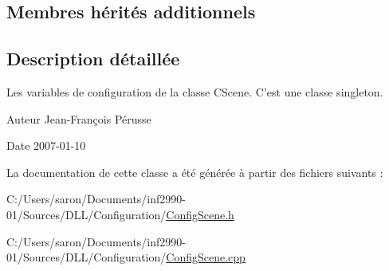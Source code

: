 \subsection*{Membres hérités additionnels}


\subsection{Description détaillée}
Les variables de configuration de la classe C\-Scene. C'est une classe singleton. 

\begin{DoxyAuthor}{Auteur}
Jean-\/\-François Pérusse 
\end{DoxyAuthor}
\begin{DoxyDate}{Date}
2007-\/01-\/10 
\end{DoxyDate}


La documentation de cette classe a été générée à partir des fichiers suivants \-:\begin{DoxyCompactItemize}
\item 
C\-:/\-Users/saron/\-Documents/inf2990-\/01/\-Sources/\-D\-L\-L/\-Configuration/\hyperlink{_config_scene_8h}{Config\-Scene.\-h}\item 
C\-:/\-Users/saron/\-Documents/inf2990-\/01/\-Sources/\-D\-L\-L/\-Configuration/\hyperlink{_config_scene_8cpp}{Config\-Scene.\-cpp}\end{DoxyCompactItemize}
